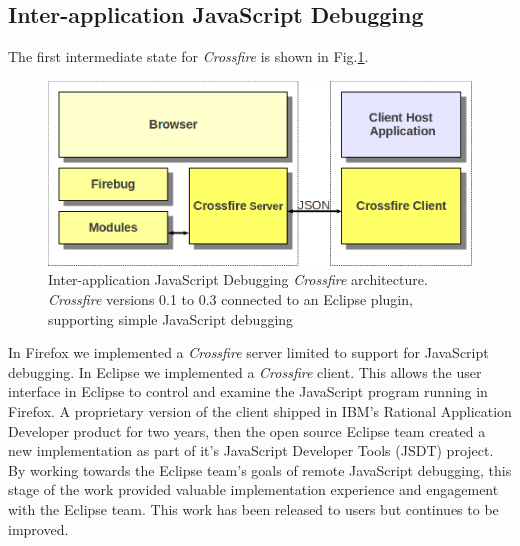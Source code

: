 \subsection{Inter-application JavaScript Debugging}
The first intermediate state for \textit{Crossfire} is shown in Fig.\ref{fig:fireclipse}.
\begin{figure}[htp]
  \includegraphics  [width = 86 mm] {figures/fireclipse.png}
  \caption{Inter-application JavaScript Debugging \textit{Crossfire} architecture.
\textit{Crossfire} versions 0.1 to 0.3 connected to an Eclipse plugin, supporting simple JavaScript debugging}
 \label{fig:fireclipse}
\end{figure}
In Firefox we implemented a \textit{Crossfire} server limited to support for JavaScript debugging.
In Eclipse we implemented a \textit{Crossfire} client. This allows the user interface in Eclipse to control
 and examine the JavaScript program running
in Firefox.  A proprietary version of the client shipped in IBM's Rational
Application Developer product for two years, then the open source Eclipse team created a new implementation as part of it's JavaScript Developer
Tools (JSDT) project\cite{EclipseJSDT}.  By working towards the Eclipse team's
goals of remote JavaScript debugging, this stage of the work provided valuable implementation
experience and engagement with the Eclipse team.
This work has been released to users but continues to be improved.

